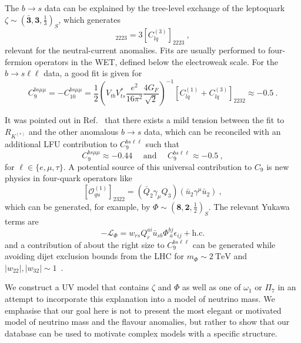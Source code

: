 The $b \to s$ data can be explained by the tree-level exchange of the leptoquark
$\zeta \sim (\mathbf{\bar{3}}, \mathbf{3}, \tfrac{1}{3})_{S}$, which generates
\begin{equation}
  [C_{lq}^{(1)}]_{2223} = 3 [C_{lq}^{(3)}]_{2223} \ ,
\end{equation}
relevant for the neutral-current anomalies. Fits are usually performed to
four-fermion operators in the WET, defined below the electroweak scale. For the
$b \to s \ell \ell$ data, a good fit is given for~\cite{Aebischer:2019mlg}
\begin{equation}
  C_{9}^{bs\mu\mu} = - C_{10}^{bs\mu\mu} = \frac{1}{2} \left(  V_{tb} V_{ts}^{*} \frac{e^{2}}{16\pi^{2}} \frac{4 G_{F}}{\sqrt{2}} \right)^{-1} \left[ C_{lq}^{(1)} + C_{lq}^{(3)} \right]_{2232} \approx -0.5 \ .
\end{equation}

It was pointed out in Ref.~\cite{Aebischer:2019mlg} that there exists a mild
tension between the fit to $R_{K^{(*)}}$ and the other anomalous $b \to s$ data,
which can be reconciled with an additional LFU contribution to
$C_{9}^{bs\ell\ell}$ such that
\begin{equation}
  C_{9}^{bs\mu\mu} \approx -0.44\quad \text{ and }\quad C_{9}^{bs\ell\ell} \approx -0.5 \ ,
\end{equation}
for $\ell \in \{e, \mu, \tau\}$. A potential source of this universal
contribution to $C_{9}$ is new physics in four-quark operators
like~\cite{Aebischer:2019mlg}
\begin{equation}
  \label{eq:ouq}
  [\mathcal{O}_{qu}^{(1)}]_{2322} = (\bar{Q}_{2} \gamma_{\mu} Q_{3}) (\bar{u}_{2} \gamma^{\mu} \bar{u}_{2}) \ ,
\end{equation}
which can be generated, for example, by
$\Phi \sim (\mathbf{8}, \mathbf{2}, \tfrac{1}{2})_{S}$. The relevant Yukawa terms are
\begin{equation}
  \label{eq:phi-yuks}
  - \mathscr{L}_{\Phi} = w_{rs} Q_{r}^{ai} \bar{u}_{sb} \Phi^{bj}_{\ a} \epsilon_{ij} + \text{h.c.}
\end{equation}
and a contribution of about the right size to $C_{9}^{bs\ell\ell}$ can be
generated while avoiding dijet exclusion bounds from the LHC for
$m_{\Phi} \sim \SI{2}{\TeV}$ and
$|w_{22}|, |w_{32}| \sim 1$~\cite{Aebischer:2019mlg}.

We construct a UV model that contains $\zeta$ and $\Phi$ as well as one of
$\omega_{1}$ or $\Pi_{7}$ in an attempt to incorporate this explanation into a
model of neutrino mass. We emphasise that our goal here is not to present the
most elegant or motivated model of neutrino mass and the flavour anomalies, but
rather to show that our database can be used to motivate complex models with a
specific structure.

